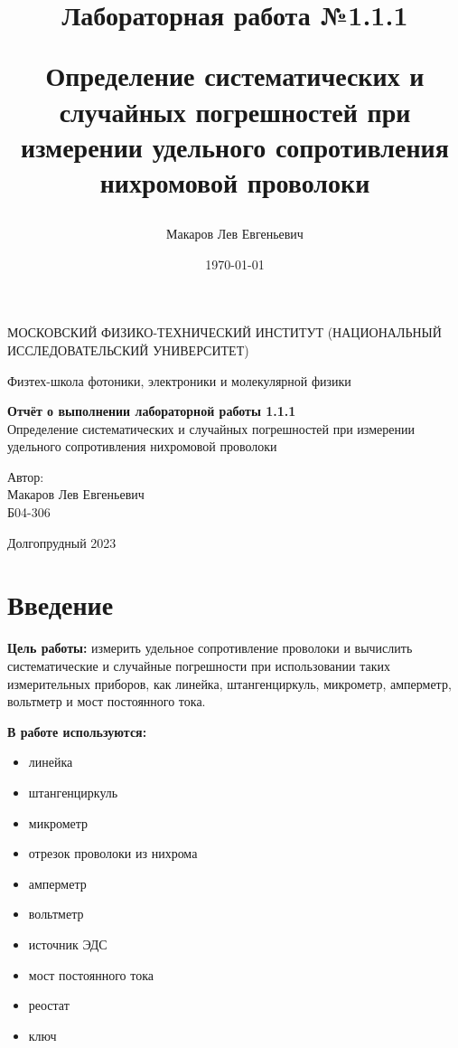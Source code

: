 \documentclass[a4paper,12pt]{article} %
\author{Макаров Лев Евгеньевич}
\title{Лабораторная работа №1.1.1

Определение систематических и случайных погрешностей при измерении удельного сопротивления нихромовой проволоки
}
\date{\today}
\begin{document}
\begin{titlepage}
	\begin{center}
		{\large МОСКОВСКИЙ ФИЗИКО-ТЕХНИЧЕСКИЙ ИНСТИТУТ (НАЦИОНАЛЬНЫЙ ИССЛЕДОВАТЕЛЬСКИЙ УНИВЕРСИТЕТ)}
	\end{center}
	\begin{center}
		{\large Физтех-школа фотоники, электроники и молекулярной физики}
	\end{center}
	
	
	\vspace{4.5cm}
	{\huge
		\begin{center}
			{\bf Отчёт о выполнении лабораторной работы 1.1.1}\\
			Определение систематических и случайных погрешностей при измерении удельного сопротивления нихромовой проволоки
		\end{center}
	}
	\vspace{2cm}
	\begin{flushright}
		{\LARGE Автор:\\ Макаров Лев Евгеньевич \\
			\vspace{0.2cm}
			Б04-306}
	\end{flushright}
	\vspace{8cm}
	\begin{center}
		Долгопрудный 2023
	\end{center}
\end{titlepage}

\section{Введение}

\textbf{Цель работы:} измерить удельное сопротивление проволоки и вычислить систематические и случайные погрешности при использовании таких измерительных приборов, как линейка, штангенциркуль, микрометр, амперметр, вольтметр и мост постоянного тока.
\medskip

\textbf{В работе используются:} 
\begin{itemize}
    \item линейка
    \item штангенциркуль
    \item микрометр
    \item отрезок проволоки из нихрома
    \item амперметр
    \item вольтметр
    \item источник ЭДС
    \item мост постоянного тока
    \item реостат
    \item ключ
\end{itemize}
\medskip
\end{document}
